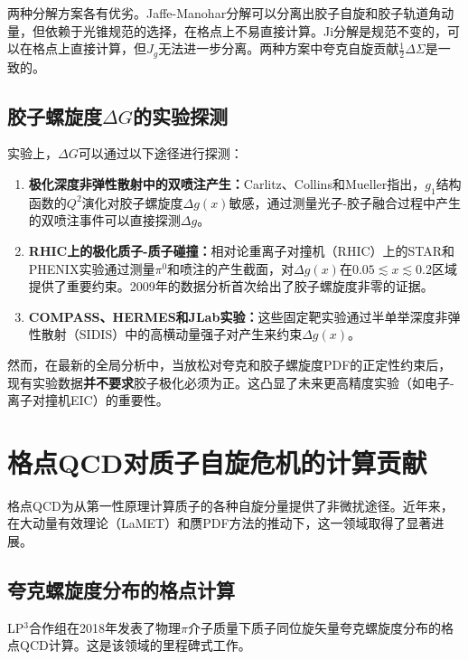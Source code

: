 \documentclass[12pt,a4paper]{ctexart}
\theoremstyle{definition}
\begin{document}
两种分解方案各有优劣。Jaffe-Manohar分解可以分离出胶子自旋和胶子轨道角动量，但依赖于光锥规范的选择，在格点上不易直接计算。Ji分解是规范不变的，可以在格点上直接计算，但$J_g$无法进一步分离。两种方案中夸克自旋贡献$\frac{1}{2}\Delta\Sigma$是一致的。

\subsection{胶子螺旋度$\Delta G$的实验探测}

实验上，$\Delta G$可以通过以下途径进行探测：

\begin{enumerate}
    \item \textbf{极化深度非弹性散射中的双喷注产生：}Carlitz、Collins和Mueller指出\cite{CarlitzCollinsMueller}，$g_1$结构函数的$Q^2$演化对胶子螺旋度$\Delta g(x)$敏感，通过测量光子-胶子融合过程中产生的双喷注事件可以直接探测$\Delta g$。

    \item \textbf{RHIC上的极化质子-质子碰撞：}相对论重离子对撞机（RHIC）上的STAR和PHENIX实验通过测量$\pi^0$和喷注的产生截面，对$\Delta g(x)$在$0.05 \lesssim x \lesssim 0.2$区域提供了重要约束\cite{DSSV14}。2009年的数据分析首次给出了胶子螺旋度非零的证据。

    \item \textbf{COMPASS、HERMES和JLab实验：}这些固定靶实验通过半单举深度非弹性散射（SIDIS）中的高横动量强子对产生来约束$\Delta g(x)$。
\end{enumerate}

然而，在最新的全局分析中\cite{JAM24}，当放松对夸克和胶子螺旋度PDF的正定性约束后，现有实验数据\textbf{并不要求}胶子极化必须为正。这凸显了未来更高精度实验（如电子-离子对撞机EIC）的重要性。

\section{格点QCD对质子自旋危机的计算贡献}

格点QCD为从第一性原理计算质子的各种自旋分量提供了非微扰途径。近年来，在大动量有效理论（LaMET）和赝PDF方法的推动下，这一领域取得了显著进展。

\subsection{夸克螺旋度分布的格点计算}

LP$^3$合作组在2018年发表了物理$\pi$介子质量下质子同位旋矢量夸克螺旋度分布的格点QCD计算\cite{LP3helicity}。这是该领域的里程碑式工作。
\end{document}
